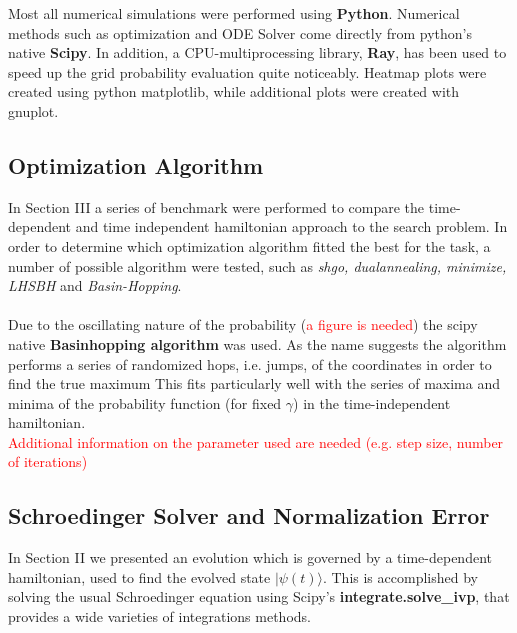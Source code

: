 \documentclass[11pt, twoside]{report}
\newcommand{\red}[1]{\textcolor{red}{#1}}
\begin{document}
Most all numerical simulations were performed using \textbf{Python}. Numerical methods such as optimization and ODE Solver come directly from python's native \textbf{Scipy}. In addition, a CPU-multiprocessing library, \textbf{Ray}, has been used to speed up the grid probability evaluation quite noticeably. Heatmap plots were created using python matplotlib, while additional plots were created with gnuplot.

\subsection{Optimization Algorithm}
In Section III a series of benchmark were performed to compare the time-dependent and time independent hamiltonian approach to the search problem. In order to determine which optimization algorithm fitted the best for the task, a number of possible algorithm were tested, such as \textit{shgo, dualannealing, minimize, LHSBH} and \textit{Basin-Hopping}.\\ \\
Due to the oscillating nature of the probability (\red{a figure is needed}) the scipy native \textbf{Basinhopping algorithm} was used. As the name suggests the algorithm performs a series of randomized hops, i.e. jumps, of the coordinates in order to find the true maximum This fits particularly well with the series of maxima and minima of the probability function (for fixed $\gamma$) in the time-independent hamiltonian. \\\red{Additional information on the parameter used are needed (e.g. step size, number of iterations)}

\subsection{Schroedinger Solver and Normalization Error}
In Section II we presented an evolution which is governed by a time-dependent hamiltonian, used to find the evolved state $|\psi(t)\rangle$. This is accomplished by solving the usual Schroedinger equation using Scipy's \textbf{integrate.solve\_ivp}, that provides a wide varieties of integrations methods. \\
\end{document}

